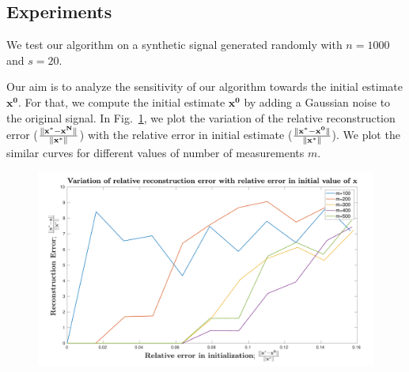 \subsection{Experiments}
We test our algorithm on a synthetic signal generated randomly with $n=1000$ and $s=20$. 

Our aim is to analyze the sensitivity of our algorithm towards the initial estimate $\mathbf{x^0}$. %
For that, we compute the initial estimate $\mathbf{x^0}$ by adding a Gaussian noise to the original signal. In Fig.~\ref{fig:pl}, we plot the variation of the relative reconstruction error ($\frac{\|\mathbf{x^*-x^N}\|}{\|\mathbf{x^*}\|}$) with the relative error in initial estimate ($\frac{\|\mathbf{x^*-x^0}\|}{\|\mathbf{x^*}\|}$). We plot the similar curves for different values of number of measurements $m$.
\begin{figure}[t]
	\begin{center}
		\includegraphics[width=\linewidth]{./fig/graph.pdf}
	\end{center}
	\caption{}
	\label{fig:pl}
\end{figure}

